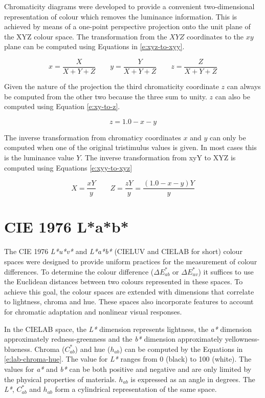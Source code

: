 Chromaticity diagrams were developed to provide a convenient
two-dimensional representation of colour which removes the luminance
information. This is achieved by means of a one-point perspective
projection onto the unit plane of the XYZ colour space. The
transformation from the $XYZ$ coordinates to the $xy$ plane can be
computed using Equations in \ref{e:xyz-to-xyy}.

\begin{equation}
x = \frac{X}{X + Y + Z} \qquad
y = \frac{Y}{X + Y + Z} \qquad
z = \frac{Z}{X + Y + Z}
\label{e:xyz-to-xyy}
\end{equation}

Given the nature of the projection the third chromaticity coordinate
$z$ can always be computed from the other two because the three sum
to unity. $z$ can also be computed using Equation \ref{e:xy-to-z}.

\begin{equation}
z = 1.0 - x - y
\label{e:xy-to-z}
\end{equation}

The inverse transformation from chromaticy coordinates $x$ and $y$ can
only be computed when one of the original tristimulus values is
given. In most cases this is the luminance value $Y$. The inverse
transformation from xyY to XYZ is computed using Equations
\ref{e:xyy-to-xyz}

\begin{equation}
X = \frac{xY}{y} \qquad
Z = \frac{zY}{y} =  \frac{(1.0-x-y)Y}{y}
\label{e:xyy-to-xyz}
\end{equation}

\section{CIE 1976 L*a*b*}
\label{s:lab}


The CIE 1976 \emph{L*u*v*} and \emph{L*a*b*} (CIELUV and CIELAB for
short) colour spaces were designed to provide uniform practices for
the measurement of colour differences. To determine the colour
difference ($\Delta E^*_{ab}$ or $\Delta E^*_{uv}$) it suffices to use
the Euclidean distances between two colours represented in these
spaces. To achieve this goal, the colour spaces are extended with
dimensions that correlate to lightness, chroma and hue. These spaces
also incorporate features to account for chromatic adaptation and
nonlinear visual responses.

In the CIELAB space, the \emph{L*} dimension represents lightness, the
\emph{a*} dimension approximately redness-greenness and the \emph{b*}
dimension approximately yellowness-blueness. Chroma ($C^*_{ab}$) and
hue ($h_{ab}$) can be computed by the Equations in
\ref{e:lab-chroma-hue}. The value for \emph{L*} ranges from 0 (black)
to 100 (white). The values for \emph{a*} and \emph{b*} can be both
positive and negative and are only limited by the physical properties
of materials.  $h_{ab}$ is expressed as an angle in degrees. The
\emph{L*}, $C^*_{ab}$ and $h_{ab}$ form a cylindrical representation
of the same space.

